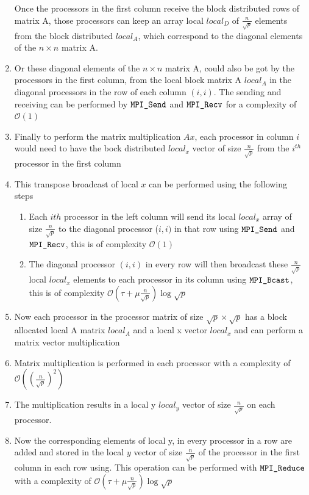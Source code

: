 \documentclass[twoside,11pt]{article}\usepackage{amsmath,amsfonts,amsthm,fullpage}
\begin{document}
\begin{enumerate}
Once the processors in the first column receive the block distributed rows of matrix A, those processors can keep an array local $local_D$ of $\frac{n}{\sqrt{p}}$ elements from the block distributed $local_A$, which correspond to the diagonal elements of the $n\times n$ matrix A.
\item
Or these diagonal elements of the $n\times n$ matrix A, could also be got by the processors in the first column, from the local block matrix A $local_A$ in the diagonal processors in the row of each column $(i,i)$. The sending and receiving can be performed by $\verb|MPI_Send|$ and $\verb|MPI_Recv|$ for a complexity of $\mathcal{O}(1)$
\item
Finally to perform the matrix multiplication $Ax$, each processor in column $i$ would need to have the bock distributed $local_x$ vector of size $\frac{n}{\sqrt{p}}$ from the $i^{th}$ processor in the first column
\item
This transpose broadcast of local $x$ can be performed using the following steps
\begin{enumerate}
\item
Each $i{th}$ processor in the left column will send its local $local_x$ array of size $\frac{n}{\sqrt{p}}$ to the diagonal processor ($i,i)$ in that row using $\verb|MPI_Send|$ and $\verb|MPI_Recv|$, this is of complexity $\mathcal{O}(1)$
\item
The diagonal processor $(i,i)$ in every row will then broadcast these $\frac{n}{\sqrt{p}}$ local $local_x$ elements to each processor in its column using $\verb|MPI_Bcast|$, this is of complexity $\mathcal{O}(\tau+\mu \frac{n}{\sqrt{p}}) \log \sqrt{p}$
\end{enumerate}
\item
Now each processor in the processor matrix of size $\sqrt{p}\times \sqrt{p}$ has a block allocated local A matrix $local_A$ and a local x vector $local_x$ and can perform a matrix vector multiplication
\item
Matrix multiplication is performed in each processor with a complexity of $\mathcal{O}({(\frac{n}{\sqrt{p}})}^2)$
\item
The multiplication results in a local y $local_y$ vector of size  $\frac{n}{\sqrt{p}}$ on each processor. 
\item
Now the corresponding elements of local y, in every processor in a row are added and stored in the local $y$ vector of size $\frac{n}{\sqrt{p}}$ of the processor in the first column in each row using. This operation can be performed with $\verb|MPI_Reduce|$ with a complexity of $\mathcal{O}(\tau  + \mu \frac{n}{\sqrt{p}} ) \log \sqrt{p}$

\end{enumerate}
\end{document}
